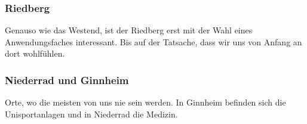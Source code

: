 		\subsubsection{Riedberg}
			Genauso wie das Westend, ist der Riedberg erst mit der Wahl eines Anwendungsfaches interessant. Bis auf der Tatsache, dass wir uns von Anfang an dort wohlfühlen.
		\subsubsection{Niederrad und Ginnheim}
			Orte, wo die meisten von uns nie sein werden. In Ginnheim befinden sich die Unisportanlagen und in Niederrad die Medizin.
	

